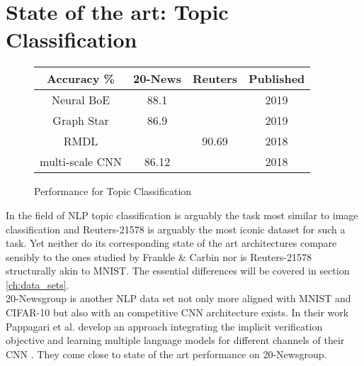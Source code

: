 \section{State of the art: Topic Classification}
\begin{figure}
	\begin{tabular}{c|c|c|c}
		Accuracy \% & 20-News & Reuters & Published\\
		\hline
		Neural BoE & 88.1 &  & 2019 \\
		Graph Star & 86.9 &  & 2019 \\
		RMDL &  & 90.69 & 2018 \\
		\hline
		multi-scale CNN & 86.12 &  & 2018 \\
		
	\end{tabular}
	\caption{Performance for Topic Classification}
\end{figure}
In the field of NLP topic classification is arguably the task most similar to image classification and Reuters-21578 is arguably the most iconic dataset for such a task. Yet neither do its corresponding state of the art architectures compare sensibly to the ones studied by Frankle \& Carbin nor is Reuters-21578 structurally akin to MNIST. The essential differences will be covered in section \ref{ch:data_sets}. \\
20-Newsgroup is another NLP data set not only more aligned with MNIST and CIFAR-10 but also with an competitive CNN architecture exists. In their work Pappagari et al. develop an approach integrating the implicit verification objective and learning multiple language models for different channels of their CNN \cite{End-to-End-CNN}. They come close to state of the art performance on 20-Newsgroup. 

